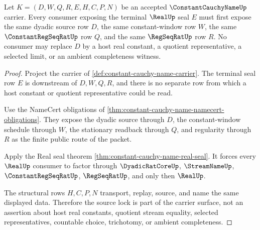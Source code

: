 \begin{theorem}
\label{thm:constant-cauchy-name-dyadic-source-uniqueness}
Let $K=(D,W,Q,R,E,H,C,P,N)$ be an accepted $\ConstantCauchyNameUp$ carrier. Every consumer exposing the terminal $\RealUp$ seal $E$ must first expose the same dyadic source row $D$, the same constant-window row $W$, the same $\ConstantRegSeqRatUp$ row $Q$, and the same $\RegSeqRatUp$ row $R$. No consumer may replace $D$ by a host real constant, a quotient representative, a selected limit, or an ambient completeness witness.
\end{theorem}
\begin{proof}
Project the carrier of \autoref{def:constant-cauchy-name-carrier}. The terminal seal row $E$ is downstream of $D,W,Q,R$, and there is no separate row from which a host constant or quotient representative could be read.

Use the NameCert obligations of \autoref{thm:constant-cauchy-name-namecert-obligations}. They expose the dyadic source through $D$, the constant-window schedule through $W$, the stationary readback through $Q$, and regularity through $R$ as the finite public route of the packet.

Apply the Real seal theorem \autoref{thm:constant-cauchy-name-real-seal}. It forces every $\RealUp$ consumer to factor through $\DyadicRatCoreUp$, $\StreamNameUp$, $\ConstantRegSeqRatUp$, $\RegSeqRatUp$, and only then $\RealUp$.

The structural rows $H,C,P,N$ transport, replay, source, and name the same displayed data. Therefore the source lock is part of the carrier surface, not an assertion about host real constants, quotient stream equality, selected representatives, countable choice, trichotomy, or ambient completeness.
\end{proof}



